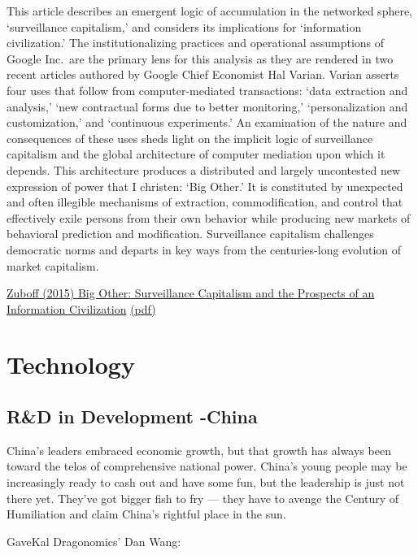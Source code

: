 \documentclass[
]{book}
\begin{document}
This article describes an emergent logic of accumulation in the networked sphere, `surveillance capitalism,' and considers its implications for `information civilization.' The institutionalizing practices and operational assumptions of Google Inc.~are the primary lens for this analysis as they are rendered in two recent articles authored by Google Chief Economist Hal Varian. Varian asserts four uses that follow from computer-mediated transactions: `data extraction and analysis,' `new contractual forms due to better monitoring,' `personalization and customization,' and `continuous experiments.' An examination of the nature and consequences of these uses sheds light on the implicit logic of surveillance capitalism and the global architecture of computer mediation upon which it depends. This architecture produces a distributed and largely uncontested new expression of power that I christen: `Big Other.' It is constituted by unexpected and often illegible mechanisms of extraction, commodification, and control that effectively exile persons from their own behavior while producing new markets of behavioral prediction and modification. Surveillance capitalism challenges democratic norms and departs in key ways from the centuries-long evolution of market capitalism.

\href{https://www.hbs.edu/faculty/Pages/item.aspx?num=49122}{Zuboff (2015) Big Other: Surveillance Capitalism and the Prospects of an Information Civilization}
\href{pdf/Zuboff_2015_Surveillance_Capitalism.pdf}{(pdf)}

\hypertarget{technology}{%
\chapter{Technology}\label{technology}}

\hypertarget{rd-in-development--china}{%
\section{R\&D in Development -China}\label{rd-in-development--china}}

China's leaders embraced economic growth, but that growth has always been toward the telos of comprehensive national power. China's young people may be increasingly ready to cash out and have some fun, but the leadership is just not there yet. They've got bigger fish to fry --- they have to avenge the Century of Humiliation and claim China's rightful place in the sun.

GaveKal Dragonomics' Dan Wang:
\end{document}
